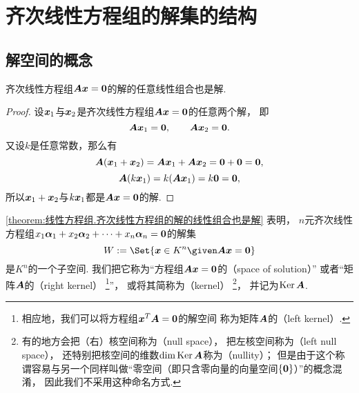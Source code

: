 \section{齐次线性方程组的解集的结构}
\subsection{解空间的概念}
\begin{proposition}\label{theorem:线性方程组.齐次线性方程组的解的线性组合也是解}
齐次线性方程组\(\boldsymbol{A} \boldsymbol{x} = \boldsymbol0\)的解的任意线性组合也是解.
\begin{proof}
设\(\boldsymbol{x}_1\)与\(\boldsymbol{x}_2\)是齐次线性方程组\(\boldsymbol{A} \boldsymbol{x} = \boldsymbol0\)的任意两个解，
即\begin{equation*}
	\boldsymbol{A}\boldsymbol{x}_1=\boldsymbol0, \qquad
	\boldsymbol{A}\boldsymbol{x}_2=\boldsymbol0.
\end{equation*}
又设\(k\)是任意常数，那么有\begin{equation*}
	\boldsymbol{A} (\boldsymbol{x}_1 + \boldsymbol{x}_2) = \boldsymbol{A} \boldsymbol{x}_1 + \boldsymbol{A} \boldsymbol{x}_2 = \boldsymbol0 + \boldsymbol0 = \boldsymbol0,
\end{equation*}\begin{equation*}
	\boldsymbol{A} (k \boldsymbol{x}_1) = k (\boldsymbol{A} \boldsymbol{x}_1) = k \boldsymbol0 = \boldsymbol0,
\end{equation*}
所以\(\boldsymbol{x}_1 + \boldsymbol{x}_2\)与\(k \boldsymbol{x}_1\)都是\(\boldsymbol{A} \boldsymbol{x} = \boldsymbol0\)的解.
\end{proof}
\end{proposition}

\cref{theorem:线性方程组.齐次线性方程组的解的线性组合也是解} 表明，
\(n\)元齐次线性方程组\(x_1\boldsymbol\alpha_1+x_2\boldsymbol\alpha_2+\dotsb+x_n\boldsymbol\alpha_n=\boldsymbol0\)的解集\begin{equation*}
	W
	\defeq
	\Set{
		\vb{x} \in K^n
		\given
		\vb{A} \vb{x} = \vb0
	}
\end{equation*}是\(K^n\)的一个子空间.
我们把它称为“方程组\(\boldsymbol{A} \boldsymbol{x} = \boldsymbol0\)的（space of solution）”
或者“矩阵\(\boldsymbol{A}\)的（right kernel）
\footnote{
	相应地，我们可以将方程组\(\boldsymbol{x}^T \boldsymbol{A} = \boldsymbol0\)的解空间
	称为矩阵\(\boldsymbol{A}\)的（left kernel）.
}”，
或将其简称为（kernel）
\footnote{
	有的地方会把（右）核空间称为（null space），
	把左核空间称为（left null space），
	还特别把核空间的维数\(\dim\operatorname{Ker}\boldsymbol{A}\)称为（nullity）；
	但是由于这个称谓容易与另一个同样叫做“零空间（即只含零向量的向量空间\(\{\boldsymbol0\}\)）”的概念混淆，
	因此我们不采用这种命名方式.
}，
并记为\(\operatorname{Ker}\boldsymbol{A}\).

